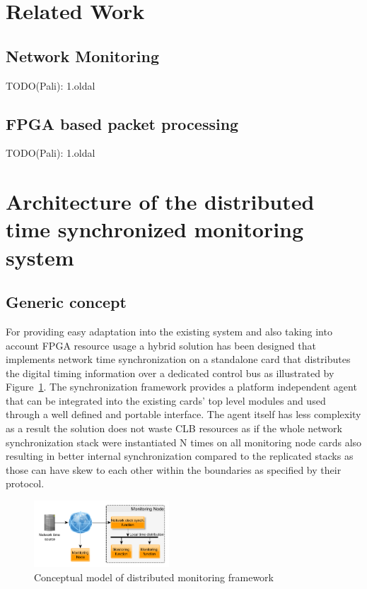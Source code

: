 \documentclass[article]{IEEEtran}
\begin{document}
\section{Related Work}

\subsection{Network Monitoring}
TODO(Pali): 1.oldal


\subsection{FPGA based packet processing}
 TODO(Pali): 1.oldal

\IEEEpubidadjcol

\section{Architecture of the distributed time synchronized monitoring system}

\subsection{Generic concept}
For providing easy adaptation into the existing system and also taking into account FPGA resource usage a hybrid solution
has been designed that implements network time synchronization on a standalone card that distributes the digital timing 
information over a dedicated control bus as illustrated by Figure~\ref{fig:concept}. 
The synchronization framework provides a platform independent agent that 
can be integrated into the existing cards' top level modules and used through a well defined and portable interface. 
The agent itself has less complexity as a result the solution does not waste CLB resources as if the whole network 
synchronization stack were instantiated N times on all monitoring node cards also resulting in better internal synchronization
compared to the replicated stacks as those can have skew to each other within the boundaries as specified by their protocol.

\begin{figure}[!htb]
    \centering
    \includegraphics[width=0.45\textwidth]{figures_raw/concept.png}
    \caption{Conceptual model of distributed monitoring framework}
    \label{fig:concept}
\end{figure}
\end{document}
